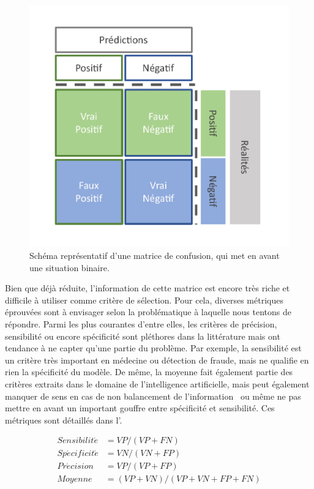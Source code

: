\begin{figure}[H]
    \centering
    \includegraphics[width=0.55\linewidth]{contents/chapter_3/resources/scheme_confusion_matrix.pdf}
    \caption{Schéma représentatif d’une matrice de confusion, qui met en avant une situation binaire.}
    \label{fig:scheme_confusion_matrix}
\end{figure}

Bien que déjà réduite, l'information de cette matrice est encore très riche et difficile à utiliser comme critère de sélection. Pour cela, diverses métriques éprouvées sont à envisager selon la problématique à laquelle nous tentons de répondre. Parmi les plus courantes d'entre elles, les critères de précision, sensibilité ou encore spécificité sont pléthores dans la littérature mais ont tendance à ne capter qu'une partie du problème. Par exemple, la sensibilité est un critère très important en médecine ou détection de fraude, mais ne qualifie en rien la spécificité du modèle. De même, la moyenne fait également partie des critères extraits dans le domaine de l'intelligence artificielle, mais peut également manquer de sens en cas de non balancement de l'information~\cite{Guo2008} ou même ne pas mettre en avant un important gouffre entre spécificité et sensibilité. Ces métriques sont détaillés dans l'.\par

\begin{equation} 
    \label{eq:metrics_basics}
    \begin{split}
    Sensibilit\acute{e} &= VP/(VP+FN) \\	
    Sp\acute{e}cificit\acute{e} &=  VN/(VN+FP) \\
    Pr\acute{e}cision &= VP/(VP+FP) \\
    Moyenne &= (VP+VN)/(VP+VN+FP+FN)
    \end{split}
\end{equation}

